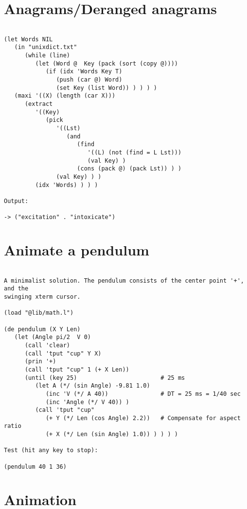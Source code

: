 \section*{Anagrams/Deranged anagrams}

\begin{verbatim}

(let Words NIL
   (in "unixdict.txt"
      (while (line)
         (let (Word @  Key (pack (sort (copy @))))
            (if (idx 'Words Key T)
               (push (car @) Word)
               (set Key (list Word)) ) ) ) )
   (maxi '((X) (length (car X)))
      (extract
         '((Key)
            (pick
               '((Lst)
                  (and
                     (find
                        '((L) (not (find = L Lst)))
                        (val Key) )
                     (cons (pack @) (pack Lst)) ) )
               (val Key) ) )
         (idx 'Words) ) ) )

Output:

-> ("excitation" . "intoxicate")

\end{verbatim}

\section*{Animate a pendulum}

\begin{verbatim}

A minimalist solution. The pendulum consists of the center point '+', and the
swinging xterm cursor.

(load "@lib/math.l")

(de pendulum (X Y Len)
   (let (Angle pi/2  V 0)
      (call 'clear)
      (call 'tput "cup" Y X)
      (prin '+)
      (call 'tput "cup" 1 (+ X Len))
      (until (key 25)                        # 25 ms
         (let A (*/ (sin Angle) -9.81 1.0)
            (inc 'V (*/ A 40))               # DT = 25 ms = 1/40 sec
            (inc 'Angle (*/ V 40)) )
         (call 'tput "cup"
            (+ Y (*/ Len (cos Angle) 2.2))   # Compensate for aspect ratio
            (+ X (*/ Len (sin Angle) 1.0)) ) ) ) )

Test (hit any key to stop):

(pendulum 40 1 36)

\end{verbatim}

\section*{Animation}

